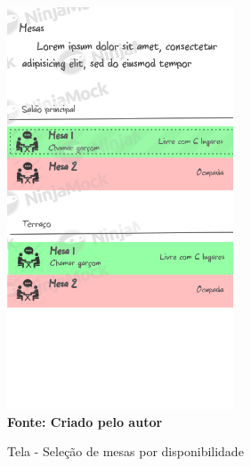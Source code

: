 \begin{figure}[ht]
	\centering	
	\caption[\hspace{0.1cm}]{Tela - Seleção de mesas por disponibilidade}
	\vspace{-0.4cm}
	\includegraphics[width=0.6\textwidth]{figuras/c_tables.png}
	 \vspace{-0.2cm}
	\\\textbf{\footnotesize Fonte: Criado pelo autor }
	\label{fig:w2}
\end{figure}
\vspace{-0.5cm}

